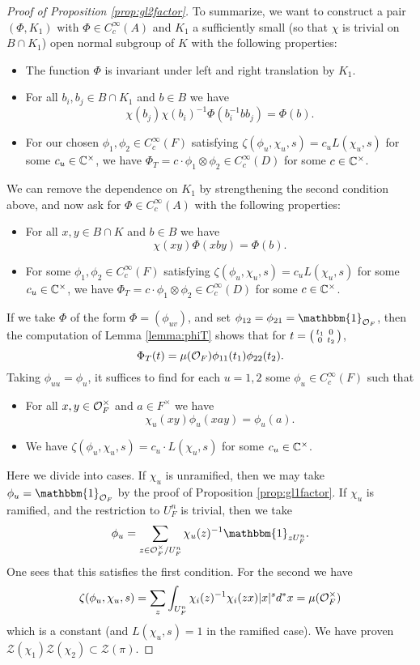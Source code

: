 \begin{proof}[Proof of Proposition \ref{prop:gl2factor}]
    To summarize, we want to construct a pair $(\Phi,K_1)$ with $\Phi \in C_c^\infty(A)$ and $K_1$ a sufficiently small (so that $\chi$ is trivial on $B \cap K_1$) open normal subgroup of $K$ with the following properties:
    \begin{itemize}
        \item The function $\Phi$ is invariant under left and right translation by $K_1$.
        \item For all $b_i,b_j \in B \cap K_1$ and $b \in B$ we have $$\chi(b_j)\chi(b_i)^{-1}\Phi(b_i^{-1}bb_j) = \Phi(b).$$
        \item For our chosen $\phi_1,\phi_2 \in C_c^\infty(F)$ satisfying $\zeta(\phi_u,\chi_u,s)=c_uL(\chi_u,s)$ for some $c_u \in \mathbb{C}^\times$, we have $\Phi_T = c \cdot \phi_1 \otimes \phi_2 \in C_c^\infty(D)$ for some $c \in \mathbb{C}^\times$.
    \end{itemize}
    We can remove the dependence on $K_1$ by strengthening the second condition above, and now ask for $\Phi \in C_c^\infty(A)$ with the following properties:
    \begin{itemize}
        \item For all $x,y \in B \cap K$ and $b \in B$ we have $$\chi(xy)\Phi(xby) = \Phi(b).$$
        \item For some $\phi_1,\phi_2 \in C_c^\infty(F)$ satisfying $\zeta(\phi_u,\chi_u,s)=c_uL(\chi_u,s)$ for some $c_u \in \mathbb{C}^\times$, we have $\Phi_T = c \cdot \phi_1 \otimes \phi_2 \in C_c^\infty(D)$ for some $c \in \mathbb{C}^\times$.
    \end{itemize}
    If we take $\Phi$ of the form $\Phi=(\phi_{uv})$, and set $\phi_{12}=\phi_{21}=\mathbbm{1}_{\mathcal O_F}$, then the computation of Lemma \ref{lemma:phiT} shows that for $t= \begin{psmallmatrix}
        t_1&0\\0&t_2
    \end{psmallmatrix}$,
    $$\Phi_T(t) = \mu(\mathcal{O}_F)\phi_{11}(t_1)\phi_{22}(t_2).$$
    Taking $\phi_{uu}=\phi_u$, it suffices to find for each $u=1,2$ some $\phi_u \in C_c^\infty(F)$ such that
    \begin{itemize}
        \item For all $x,y \in \mathcal{O}_F^\times$ and $a \in F^\times$ we have $$\chi_u(xy)\phi_u(xay) = \phi_u(a).$$
        \item We have $\zeta(\phi_u,\chi_u,s)=c_u \cdot L(\chi_u,s)$ for some $c_u \in \mathbb{C}^\times$.
    \end{itemize}
    Here we divide into cases. If $\chi_u$ is unramified, then we may take $\phi_u = \mathbbm{1}_{\cO_F}$ by the proof of Proposition \ref{prop:gl1factor}. If $\chi_u$ is ramified, and the restriction to $U_F^n$ is trivial, then we take 
    $$ \phi_u = \sum\limits_{z \in \cO_F^\times/U_F^n} \chi_u(z)^{-1} \mathbbm{1}_{zU_F^n}.$$ One sees that this satisfies the first condition. For the second we have 
    $$\zeta(\phi_u,\chi_u,s) = \sum\limits_z \int_{U_F^n} \chi_i(z)^{-1}\chi_i(zx)|x|^s d^*x = \mu(\mathcal{O}_F^\times)$$ which is a constant (and $L(\chi_u,s)=1$ in the ramified case). We have proven $\mathcal Z(\chi_1)\mathcal Z(\chi_2) \subset \mathcal Z(\pi)$.
\end{proof}

